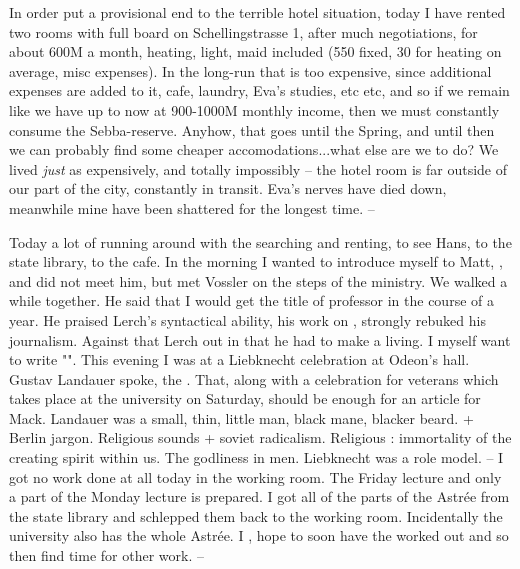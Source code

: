 
In order put a provisional end to the terrible hotel situation, today I have rented two rooms with full board on Schellingstrasse 1, after much negotiations, for about 600M a month, heating, light, maid included (550 fixed, 30 for heating on average, misc expenses). In the long-run that is too expensive, since additional expenses are added to it, cafe, laundry, Eva's studies, etc etc, and so if we remain like we have up to now at 900-1000M monthly income, then we must constantly consume the Sebba-reserve. Anyhow, that goes until the Spring, and until then we can probably find some cheaper accomodations...what else are we to do? We lived \textit{just} as expensively, and totally impossibly -- the hotel room is far outside of our part of the city, constantly in transit. Eva's nerves have died down, meanwhile mine have been shattered for the longest time. --

Today a lot of running around with the searching and renting, to see Hans, to the state library, to the cafe. In the morning I wanted to introduce myself to Matt, , and did not meet him, but met Vossler on the steps of the ministry. We walked a while together. He said that I would get the title of professor in the course of a year. He praised Lerch's syntactical ability, his work on , strongly rebuked his journalism. Against that Lerch out in that he had to make a living. I myself want to write "". This evening I was at a Liebknecht celebration at Odeon's hall. Gustav Landauer spoke, the . That, along with a celebration for veterans which takes place at the university on Saturday, should be enough for an article for Mack.  Landauer was a small, thin,  little man, black mane, blacker beard.  + Berlin jargon. Religious sounds + soviet radicalism. Religious : immortality of the creating spirit within us. The godliness in men. Liebknecht was a role model. -- I got no work done at all today in the working room. The Friday lecture and only a part of the Monday lecture is prepared. I got all of the parts of the Astrée from the state library and schlepped them back to the working room. Incidentally the university also has the whole Astrée. I , hope to soon have the  worked out and so then find time for other work. --


